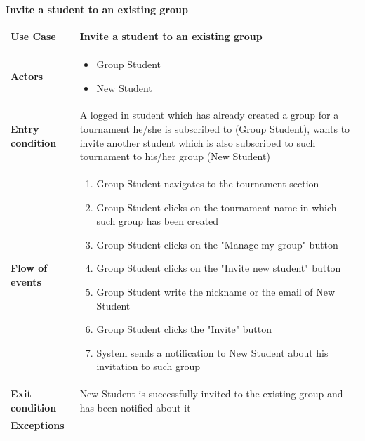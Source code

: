 \documentclass[../RASD.tex]{subfiles}
\begin{document}
        \textbf{Invite a student to an existing group}
        \begin{table}[h!]
            \begin{center}
                \begin{tabular}{|m{10em}|m{30em}|}
                \hline
                \textbf{Use Case} & Invite a student to an existing group\\
                \hline
                \textbf{Actors} & 
                    \begin{itemize}
                        \item Group Student
                        \item New Student
                    \end{itemize}\\
                \hline
                \textbf{Entry condition} & A logged in student which has already created a group for a tournament he/she is subscribed to (Group Student), wants to invite another student which is also subscribed to such tournament to his/her group (New Student)\\
                \hline
                \textbf{Flow of events} & 
                    \begin{enumerate}
                        \item Group Student navigates to the tournament section
                        \item Group Student clicks on the tournament name in which such group has been created
                        \item Group Student clicks on the "Manage my group" button
                        \item Group Student clicks on the "Invite new student" button
                        \item Group Student write the nickname or the email of New Student
                        \item Group Student clicks the "Invite" button
                        \item System sends a notification to New Student about his invitation to such group
                    \end{enumerate}\\
                \hline
                \textbf{Exit condition} & 
                    New Student is successfully invited to the existing group and has been notified about it\\
                \hline
                \textbf{Exceptions} & 

\end{tabular}
\end{center}
\end{table}
\end{document}
